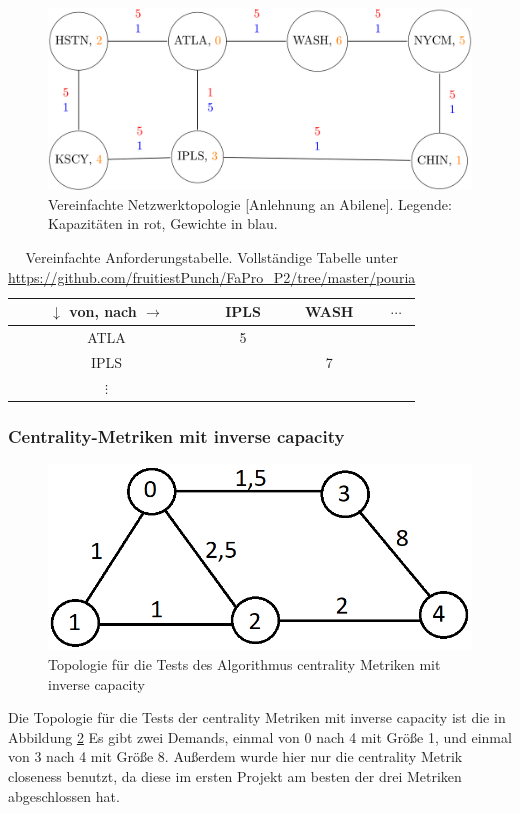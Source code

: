 \documentclass[sigconf, nonacm, review]{acmart}
\begin{document}
\begin{figure}
\centering
\includegraphics[width=\linewidth]{figures/pouria_simple_topology.png}
\caption{Vereinfachte Netzwerktopologie [Anlehnung an Abilene]. Legende: Kapazit\"aten in rot, Gewichte in blau.}
\label{fig:pouriaSimpleTopology}
\end{figure}
\begin{table}
\caption{Vereinfachte Anforderungstabelle. Vollst\"andige Tabelle unter \url{https://github.com/fruitiestPunch/FaPro_P2/tree/master/pouria}}
\label{tab:pouriaSimpleTopology}
\begin{tabular}{cccc}
\toprule
$\downarrow$ von, nach $\rightarrow$&IPLS&WASH&$\cdots$\\
\midrule
ATLA & 5 & &\\
IPLS & & 7 & \\
$\vdots$ & & & \\
\bottomrule
\end{tabular}
\end{table}
\subsubsection{Centrality-Metriken mit inverse capacity}

\begin{figure}
    \centering
    \includegraphics[width=\linewidth]{figures/kai_p2_baseTopo.png}
    \caption{Topologie für die Tests des Algorithmus centrality Metriken mit inverse capacity}
    \label{fig:kai_p2_baseTopo}
\end{figure}
Die Topologie für die Tests der centrality Metriken mit inverse capacity ist die in Abbildung \ref{fig:kai_p2_baseTopo}
Es gibt zwei Demands, einmal von 0 nach 4 mit Größe 1, und einmal von 3 nach 4 mit Größe 8.
Außerdem wurde hier nur die centrality Metrik closeness benutzt, da diese im ersten Projekt am besten der drei Metriken abgeschlossen hat.
\end{document}
